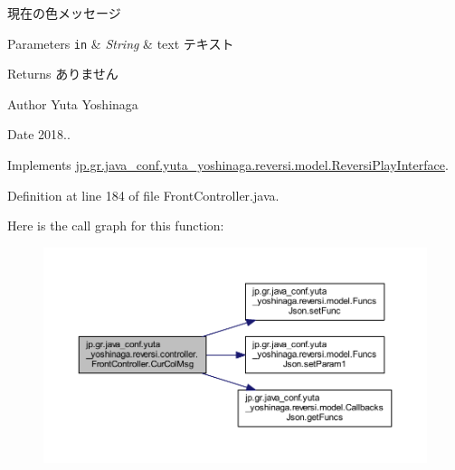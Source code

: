 現在の色メッセージ 


\begin{DoxyParams}[1]{Parameters}
\mbox{\tt in}  & {\em String} & text テキスト \\
\hline
\end{DoxyParams}
\begin{DoxyReturn}{Returns}
ありません 
\end{DoxyReturn}
\begin{DoxyAuthor}{Author}
Yuta Yoshinaga 
\end{DoxyAuthor}
\begin{DoxyDate}{Date}
2018.. 
\end{DoxyDate}


Implements \hyperlink{interfacejp_1_1gr_1_1java__conf_1_1yuta__yoshinaga_1_1reversi_1_1model_1_1_reversi_play_interface_a73764de038c314fd103a91d402049a0c}{jp.\+gr.\+java\+\_\+conf.\+yuta\+\_\+yoshinaga.\+reversi.\+model.\+Reversi\+Play\+Interface}.



Definition at line 184 of file Front\+Controller.\+java.

Here is the call graph for this function\+:
\nopagebreak
\begin{figure}[H]
\begin{center}
\leavevmode
\includegraphics[width=350pt]{classjp_1_1gr_1_1java__conf_1_1yuta__yoshinaga_1_1reversi_1_1controller_1_1_front_controller_ac49c44c8bb767770364c52164b699110_cgraph}
\end{center}
\end{figure}
\mbox{\label{classjp_1_1gr_1_1java__conf_1_1yuta__yoshinaga_1_1reversi_1_1controller_1_1_front_controller_a49315230e704778721afb73c59e14d88}} 
